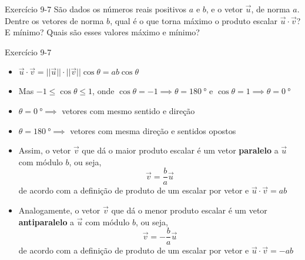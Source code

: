 \begin{frame}[c]{Exercício 9-7}
    São dados os números reais positivos \(a\) e \(b\), e o vetor \(\vec{u}\), de norma \(a\).
    Dentre os vetores de norma \(b\), qual é o que torna máximo o produto escalar \(\vec{u}\cdot\vec{v}\)?
    E mínimo? Quais são esses valores máximo e mínimo?
\end{frame}
\begin{frame}{Exercício 9-7}
    \begin{itemize}[<+->]
            \item \(
            \vec{u}\cdot\vec{v}=||\vec{u}||\cdot ||\vec{v}||\cos{\theta}=
            ab\cos{\theta}
            \)
            \item Mas \(-1 \leq \cos{\theta} \leq 1\), onde \(
            \cos{\theta}=-1 \implies\theta=\SI{180}{\degree}\) e \(
            \cos{\theta}=1 \implies\theta=\SI{0}{\degree}\)
            \item \(\theta=\SI{0}{\degree} \implies \) vetores com mesmo sentido e direção
            \item \(\theta=\SI{180}{\degree} \implies \) vetores com mesma direção e sentidos opostos
            \item Assim, o vetor \(\vec{v}\) que dá o maior produto escalar é um vetor \textbf{paralelo} a \(\vec{u}\) com módulo \(b\), ou seja,
            \[
            \vec{v}=\frac{b}{a}\vec{u}
            \]
            de acordo com a definição de produto de um escalar por vetor e \(
            \vec{u}\cdot\vec{v}=ab\)

            \item Analogamente, o vetor \(\vec{v}\) que dá o menor produto escalar é um vetor \textbf{antiparalelo} a \(\vec{u}\) com módulo \(b\), ou seja,
            \[
            \vec{v}=-\frac{b}{a}\vec{u}
            \]
            de acordo com a definição de produto de um escalar por vetor e \(
            \vec{u}\cdot\vec{v}=-ab\)
    \end{itemize}

\end{frame}

